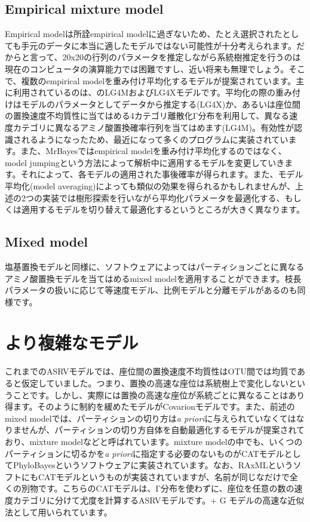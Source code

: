 \documentclass[titlepage,10pt,a4paper]{jsbook}
\begin{document}
\subsection{Empirical mixture model}

Empirical modelは所詮empirical modelに過ぎないため、たとえ選択されたとしても手元のデータに本当に適したモデルではない可能性が十分考えられます。だからと言って、20x20の行列のパラメータを推定しながら系統樹推定を行うのは現在のコンピュータの演算能力では困難ですし、近い将来も無理でしょう。そこで、複数のempirical modelを重み付け平均化するモデルが提案されています\citep{Jobb2008,Le2008,Le2010,Le2012}。主に利用されているのは、\citet{Le2012}のLG4MおよびLG4Xモデルです。平均化の際の重み付けはモデルのパラメータとしてデータから推定する(LG4X)か、あるいは座位間の置換速度不均質性に当てはめる4カテゴリ離散化Γ分布を利用して、異なる速度カテゴリに異なるアミノ酸置換確率行列を当てはめます(LG4M)。有効性が認識されるようになったため、最近になって多くのプログラムに実装されています。また、MrBayesではempirical modelを重み付け平均化するのではなく、model jumpingという方法によって解析中に適用するモデルを変更していきます\citep{Ronquist2005}。それによって、各モデルの適用された事後確率が得られます。また、モデル平均化(model averaging)によっても類似の効果を得られるかもしれませんが、上述の2つの実装では樹形探索を行いながら平均化パラメータを最適化する、もしくは適用するモデルを切り替えて最適化するというところが大きく異なります。

\subsection{Mixed model}

塩基置換モデルと同様に、ソフトウェアによってはパーティションごとに異なるアミノ酸置換モデルを当てはめるmixed modelを適用することができます。枝長パラメータの扱いに応じて等速度モデル、比例モデルと分離モデルがあるのも同様です。

\section{より複雑なモデル}

これまでのASRVモデルでは、座位間の置換速度不均質性はOTU間では均質であると仮定していました。つまり、置換の高速な座位は系統樹上で変化しないということです。しかし、実際には置換の高速な座位が系統ごとに異なることはあり得ます。そのように制約を緩めたモデルがCovarionモデルです\citep{Tuffley1998}。また、前述のmixed modelでは、パーティションの切り方は\textit{a priori}に与えられていなくてはなりませんが、パーティションの切り方自体を自動最適化するモデルが提案されており\citep{Pagel2004}、mixture modelなどと呼ばれています。mixture modelの中でも、いくつのパーティションに切るかを\textit{a priori}に指定する必要のないものがCATモデルとしてPhyloBayesというソフトウェアに実装されています\citep{Lartillot2004}。なお、RAxMLというソフトにもCATモデルというものが実装されていますが、名前が同じなだけで全くの別物です。こちらのCATモデルは、Γ分布を使わずに、座位を任意の数の速度カテゴリに分けて尤度を計算するASRVモデルです。+ G モデルの高速な近似法として用いられています。
\end{document}
